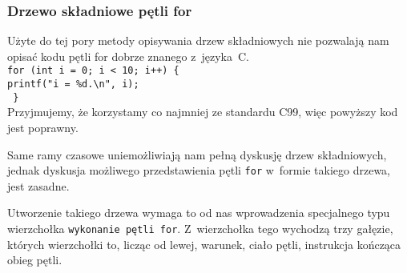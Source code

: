 \documentclass[10pt,t]{beamer}
\begin{document}
\begin{frame}
  \frametitle{Drzewo składniowe pętli for}


  Użyte do tej pory metody opisywania drzew składniowych nie pozwalają
  nam opisać kodu pętli for dobrze znanego z~języka~C. \\
  \texttt{for (int i = 0; i < 10; i++) \{ } \\
  \hphantom{aaaa} \texttt{printf("i = \%d.\textbackslash n", i);} \\
  \texttt{ \} } \\
  Przyjmujemy, że korzystamy co najmniej ze standardu C99, więc powyższy
  kod jest poprawny.

  Same ramy czasowe uniemożliwiają nam pełną dyskusję drzew składniowych,
  jednak dyskusja możliwego przedstawienia pętli \texttt{for} w~formie
  takiego drzewa, jest zasadne.

  Utworzenie takiego drzewa wymaga to od nas wprowadzenia specjalnego typu
  wierzchołka \texttt{wykonanie pętli for}. Z~wierzchołka tego wychodzą trzy
  gałęzie, których wierzchołki to, licząc od lewej, warunek, ciało pętli,
  instrukcja kończąca obieg pętli.







\end{frame}
\end{document}
